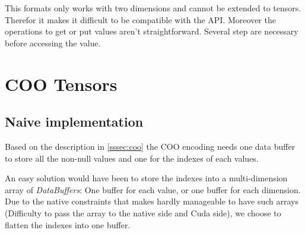 This formats only works with two dimensions and cannot be extended to tensors. Therefor it makes it difficult to be compatible with the API.
Moreover the operations to get or put values aren't straightforward. Several step are necessary before accessing the value.

\section{COO Tensors}
\subsection{Naive implementation} \label{ssec:naiveCoo}

Based on the description in \ref{sssec:coo} the COO encoding needs one data buffer to store all the non-null values and one for the indexes of each values. 

An easy solution would have been to store the indexes into a multi-dimension array of \textit{DataBuffers}: One buffer for each value, or one buffer for each dimension. Due to the native constraints that makes hardly manageable to have such arrays (Difficulty to pass the array to the native side and Cuda side), we choose to flatten the indexes into one buffer.

